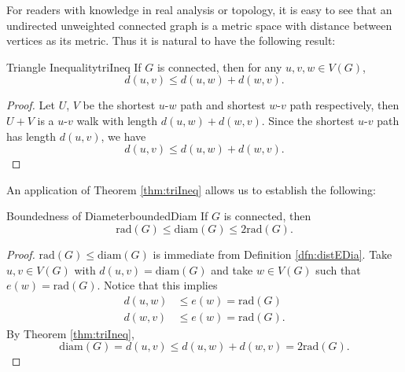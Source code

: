 \documentclass[math]{amznotes}
\theoremstyle{remark}
\begin{document}
For readers with knowledge in real analysis or topology, it is easy to see that an undirected unweighted connected graph is a metric space with distance between vertices as its metric. Thus it is natural to have the following result:
\begin{thmbox}{Triangle Inequality}{triIneq}
    If $G$ is connected, then for any $u, v, w \in V(G)$,
    \begin{equation*}
        d(u, v) \leq d(u, w) + d(w, v).
    \end{equation*}
    \tcblower   
    \begin{proof}
        Let $U$, $V$ be the shortest $u$-$w$ path and shortest $w$-$v$ path respectively, then $U + V$ is a $u$-$v$ walk with length $d(u, w) + d(w, v)$. Since the shortest $u$-$v$ path has length $d(u, v)$, we have
        \begin{equation*}
            d(u, v) \leq d(u, w) + d(w, v).
        \end{equation*}
    \end{proof}
\end{thmbox}
An application of Theorem \ref{thm:triIneq} allows us to establish the following:
\begin{thmbox}{Boundedness of Diameter}{boundedDiam}
    If $G$ is connected, then
    \begin{equation*}
        \mathrm{rad}(G) \leq \mathrm{diam}(G) \leq 2\mathrm{rad}(G).
    \end{equation*}
    \tcblower
    \begin{proof}
        $\mathrm{rad}(G) \leq \mathrm{diam}(G)$ is immediate from Definition \ref{dfn:distEDia}. Take $u, v \in V(G)$ with $d(u, v) = \mathrm{diam}(G)$ and take $w \in V(G)$ such that $e(w) = \mathrm{rad}(G)$. Notice that this implies
        \begin{align*}
            d(u, w) & \leq e(w) = \mathrm{rad}(G) \\
            d(w, v) & \leq e(w) = \mathrm{rad}(G).
        \end{align*}
        By Theorem \ref{thm:triIneq}, 
        \begin{equation*}
            \mathrm{diam}(G) = d(u, v) \leq d(u, w) + d(w, v) = 2\mathrm{rad}(G).
        \end{equation*}
    \end{proof}
\end{thmbox}
\end{document}
